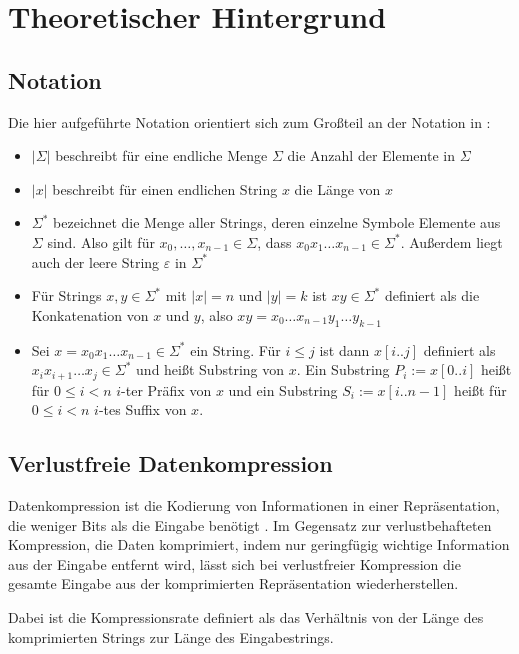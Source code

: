 \chapter{Theoretischer Hintergrund}

\section{Notation}

Die hier aufgeführte Notation orientiert sich zum Großteil an der Notation in \cite{kieffer_grammar-based_2000}:
\begin{itemize}
	\item $|\Sigma|$ beschreibt für eine endliche Menge $\Sigma$ die Anzahl der Elemente in $\Sigma$
	\item $|x|$ beschreibt für einen endlichen String $x$ die Länge von $x$
	\item $\Sigma^*$ bezeichnet die Menge aller Strings, deren einzelne Symbole Elemente aus $\Sigma$ sind. Also gilt für $x_0, \dots, x_{n-1} \in \Sigma$, dass $x_0 x_1 \dots x_{n-1} \in \Sigma^*$. Außerdem liegt auch der leere String $\varepsilon$ in $\Sigma^*$
	\item Für Strings $x, y \in \Sigma^*$ mit $|x| = n$ und $|y| = k$ ist $xy \in \Sigma^*$ definiert als die Konkatenation von $x$ und $y$, also $xy = x_0 \dots x_{n-1} y_1 \dots y_{k-1}$ 
	\item Sei $x = x_0 x_1 \dots x_{n-1} \in \Sigma^*$ ein String. Für $i \leq j$ ist dann $x[i..j]$ definiert als $x_i x_{i+1} \dots x_j \in \Sigma^*$ und heißt Substring von $x$. Ein Substring $P_i := x[0..i]$ heißt für $0 \leq i < n$ $i$-ter Präfix von $x$ und ein Substring $S_i := x[i..n - 1]$ heißt für $0 \leq i < n$ $i$-tes Suffix von $x$.
\end{itemize}

\section{Verlustfreie Datenkompression}

Datenkompression ist die Kodierung von Informationen in einer Repräsentation, die weniger Bits als die Eingabe benötigt \cite{mahdi_implementing_2012}. 
Im Gegensatz zur verlustbehafteten Kompression, die Daten komprimiert, indem nur geringfügig wichtige Information aus der Eingabe entfernt wird, lässt sich bei verlustfreier Kompression die gesamte Eingabe aus der komprimierten Repräsentation wiederherstellen. 

Dabei ist die Kompressionsrate definiert als das Verhältnis von der Länge des komprimierten Strings zur Länge des Eingabestrings.

